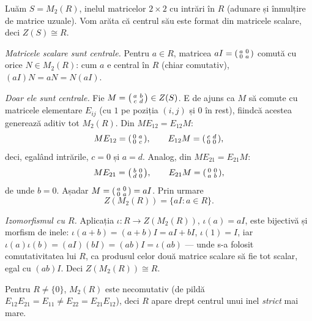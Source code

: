 \begin{solutie}
Luăm $S=M_{2}(R)$, inelul matricelor $2\times 2$ cu intrări în
$R$ (adunare și înmulțire de matrice uzuale). Vom arăta
că centrul său este format din matricele scalare, deci
$Z(S)\cong R$.

\smallskip
\textit{Matricele scalare sunt centrale.} Pentru $a\in R$, matricea
$aI=\begin{psmallmatrix}a&0\\0&a\end{psmallmatrix}$ comută cu orice
$N\in M_{2}(R)$: cum $a$ e central în $R$ (chiar comutativ),
$(aI)N=aN=N(aI)$.

\smallskip
\textit{Doar ele sunt centrale.} Fie
$M=\begin{psmallmatrix}a&b\\c&d\end{psmallmatrix}\in Z(S)$. E de ajuns ca
$M$ să comute cu matricele elementare $E_{ij}$ (cu $1$ pe poziția
$(i,j)$ și $0$ în rest), fiindcă acestea generează aditiv tot
$M_{2}(R)$. Din $ME_{12}=E_{12}M$:
\[
  ME_{12}=\begin{psmallmatrix}0&a\\0&c\end{psmallmatrix},\qquad
  E_{12}M=\begin{psmallmatrix}c&d\\0&0\end{psmallmatrix},
\]
deci, egalând intrările, $c=0$ și $a=d$. Analog, din
$ME_{21}=E_{21}M$:
\[
  ME_{21}=\begin{psmallmatrix}b&0\\d&0\end{psmallmatrix},\qquad
  E_{21}M=\begin{psmallmatrix}0&0\\a&b\end{psmallmatrix},
\]
de unde $b=0$. Așadar
$M=\begin{psmallmatrix}a&0\\0&a\end{psmallmatrix}=aI$. Prin urmare
\[
  Z(M_{2}(R))=\{aI : a\in R\}.
\]

\smallskip
\textit{Izomorfismul cu $R$.} Aplicația $\iota:R\to Z(M_{2}(R))$,
$\iota(a)=aI$, este bijectivă și morfism de inele:
$\iota(a+b)=(a+b)I=aI+bI$, $\iota(1)=I$, iar
$\iota(a)\iota(b)=(aI)(bI)=(ab)I=\iota(ab)$ --- unde s-a folosit
comutativitatea lui $R$, ca produsul celor două matrice scalare
să fie tot scalar, egal cu $(ab)I$. Deci $Z(M_{2}(R))\cong R$.

Pentru $R\neq\{0\}$, $M_{2}(R)$ este necomutativ (de pildă
$E_{12}E_{21}=E_{11}\neq E_{22}=E_{21}E_{12}$), deci $R$ apare drept centrul
unui inel \emph{strict} mai mare.
\end{solutie}

